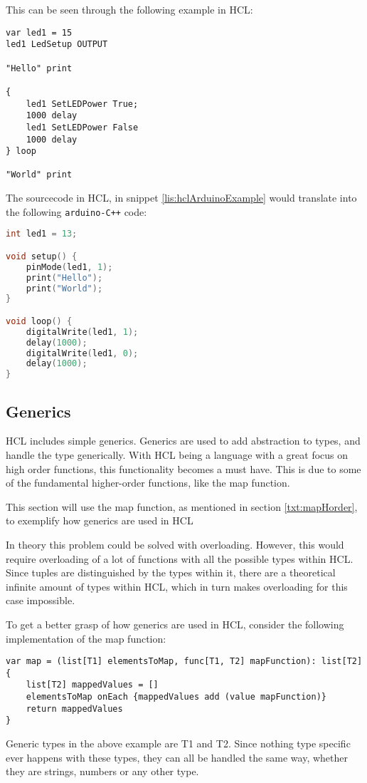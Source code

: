 This can be seen through the following example in HCL:
\begin{lstlisting}[language=HCL,caption={Example of an arduino program in HCL},label={lis:hclArduinoExample},firstnumber=1]
var led1 = 15 
led1 LedSetup OUTPUT 

"Hello" print

{
	led1 SetLEDPower True;
	1000 delay
	led1 SetLEDPower False
	1000 delay
} loop

"World" print 
\end{lstlisting}
The sourcecode in HCL, in snippet \ref{lis:hclArduinoExample} would translate into the following \texttt{arduino-C++} code:
\begin{lstlisting}[language=C,label={lis:cppArduinoExample},firstnumber=1]
int led1 = 13;

void setup() {
	pinMode(led1, 1);
	print("Hello");
	print("World");
}

void loop() {
	digitalWrite(led1, 1);
	delay(1000);
	digitalWrite(led1, 0);
	delay(1000);
} 
\end{lstlisting}

\subsection{Generics}
HCL includes simple generics.
Generics are used to add abstraction to types, and handle the type generically.
With HCL being a language with a great focus on high order functions, this functionality becomes a must have.
This is due to some of the fundamental higher-order functions, like the map function.

This section will use the map function, as mentioned in section \ref{txt:mapHorder}, to exemplify how generics are used in HCL

In theory this problem could be solved with overloading. 
However, this would require overloading of a lot of functions with all the possible types within HCL. 
Since tuples are distinguished by the types within it, there are a theoretical infinite amount of types within HCL, which in turn makes overloading for this case impossible.

To get a better grasp of how generics are used in HCL, consider the following implementation of the map function:
\begin{lstlisting}[language=HCL,label=lis:hclTypeDcls,firstnumber=1]
var map = (list[T1] elementsToMap, func[T1, T2] mapFunction): list[T2] {
	list[T2] mappedValues = []
	elementsToMap onEach {mappedValues add (value mapFunction)}
	return mappedValues
}
\end{lstlisting}

Generic types in the above example are T1 and T2. 
Since nothing type specific ever happens with these types, they can all be handled the same way, whether they are strings, numbers or any other type.
